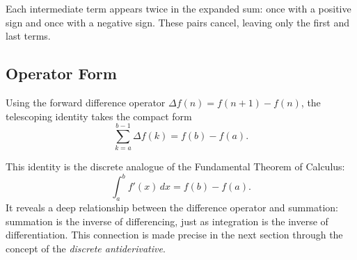 \begin{remark*}[Interpretation]
Each intermediate term appears twice in the expanded sum: once with a
positive sign and once with a negative sign. These pairs cancel, leaving
only the first and last terms.
\end{remark*}

\subsection*{Operator Form}

\begin{exposition}
Using the forward difference operator \(\Delta f(n) = f(n+1) - f(n)\),
the telescoping identity takes the compact form
\[
\sum_{k=a}^{b-1} \Delta f(k) = f(b) - f(a).
\]
\end{exposition}

\begin{remark*}[Interpretation]
This identity is the discrete analogue of the Fundamental Theorem of
Calculus:
\[
\int_a^b f'(x)\,dx = f(b)-f(a).
\]
It reveals a deep relationship between the difference operator and
summation: summation is the inverse of differencing, just as integration
is the inverse of differentiation. This connection is made precise in the
next section through the concept of the \emph{discrete antiderivative}.
\end{remark*}
